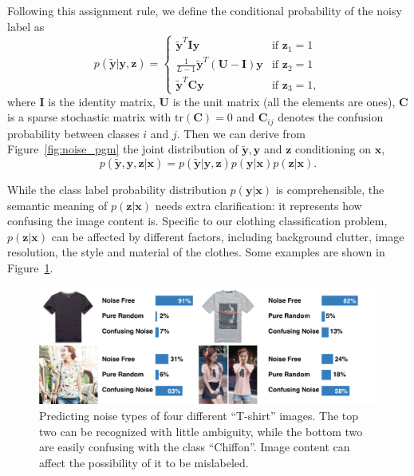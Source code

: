 \documentclass[10pt,twocolumn,letterpaper]{article}
\def\vec{\mathbf}
\def\mat{\mathbf}
\begin{document}
Following this assignment rule, we define the conditional probability of the noisy label as
\begin{equation} \label{eq:likelihood}
    p(\tilde{\vec{y}}|\vec{y},\vec{z}) = \begin{cases}
        \tilde{\vec{y}}^{T}\mat{I}\vec{y} & \text{if } \vec{z}_1 = 1 \\
        \frac{1}{L-1}\tilde{\vec{y}}^{T}(\mat{U} - \mat{I})\vec{y} & \text{if } \vec{z}_2 = 1 \\
        \tilde{\vec{y}}^{T}\mat{C}\vec{y} & \text{if } \vec{z}_3 = 1,
    \end{cases}
\end{equation}
where $\mat{I}$ is the identity matrix, $\mat{U}$ is the unit matrix (all the elements are ones), $\mat{C}$ is a sparse stochastic matrix with $\mathrm{tr}(\mat{C})=0$ and $\mat{C}_{ij}$ denotes the confusion probability between classes $i$ and $j$. Then we can derive from Figure~\ref{fig:noise_pgm} the joint distribution of $\tilde{\vec{y}}, \vec{y}$ and $\vec{z}$ conditioning on $\vec{x}$,
\begin{equation} \label{eq:joint_distribution}
  p(\tilde{\vec{y}}, \vec{y}, \vec{z} | \vec{x}) = p(\tilde{\vec{y}} | \vec{y}, \vec{z}) p(\vec{y} | \vec{x}) p(\vec{z} | \vec{x}).
\end{equation}

While the class label probability distribution $p(\vec{y} | \vec{x})$ is comprehensible, the semantic meaning of $p(\vec{z} | \vec{x})$ needs extra clarification: it represents how confusing the image content is. Specific to our clothing classification problem, $p(\vec{z} | \vec{x})$ can be affected by different factors, including background clutter, image resolution, the style and material of the clothes. Some examples are shown in Figure~\ref{fig:compare_noise_level}.

\begin{figure}[t]
\begin{center}
\includegraphics[width=1.0\linewidth]{figure/noise_level.pdf}
\end{center}
\caption{Predicting noise types of four different ``T-shirt'' images. The top two can be recognized with little ambiguity, while the bottom two are easily confusing with the class ``Chiffon''. Image content can affect the possibility of it to be mislabeled.}
\label{fig:compare_noise_level}
\end{figure}
\end{document}
